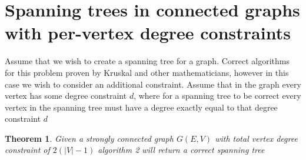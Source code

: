 \documentclass{article}
\newtheorem{theorem}{Theorem}
\begin{document}
\section{Spanning trees in connected graphs with per-vertex degree constraints}
Assume that we wish to create a spanning tree for a graph. Correct algorithms for this problem proven by Kruskal and other
mathematicians, however in this case we wish to consider an additional constraint. Assume that in the graph every vertex has some degree constraint $d$,
where for a spanning tree to be correct every vertex in the spanning tree must have a degree exactly equal to that degree constraint $d$
 
\begin{theorem}
Given a strongly connected graph $G(E,V)$ with total vertex degree constraint of $2(|V|-1)$ algorithm 2 will return a correct spanning tree
\end{theorem}
\end{document}
